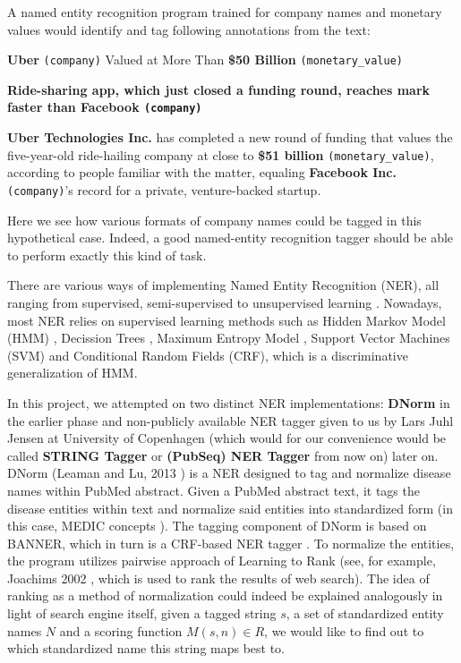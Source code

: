 A named entity recognition program trained for company names and monetary values would identify and tag following annotations from the text:

\begin{displayquote}
{\Large \textbf{Uber} \texttt{(company)} Valued at More Than  \textbf{\$50 Billion } \texttt{(monetary\_value)}}


\textbf{Ride-sharing app, which just closed a funding round, reaches mark faster than \textbf{Facebook} \texttt{(company)}}

\textbf{Uber Technologies Inc.} has completed a new round of funding that values the five-year-old ride-hailing company at close to \textbf{\$51 billion} \texttt{(monetary\_value)}, according to people familiar with the matter, equaling \textbf{Facebook Inc.} \texttt{(company)}’s record for a private, venture-backed startup.

\end{displayquote}

Here we see how various formats of company names could be tagged in this hypothetical case. Indeed, a good named-entity recognition tagger should be able to perform exactly this kind of task.

There are various ways of implementing Named Entity Recognition (NER), all ranging from supervised, semi-supervised to unsupervised learning \citep{nadeau2007survey}. Nowadays, most NER relies on supervised learning methods \citep{nadeau2007survey} such as Hidden Markov Model (HMM) \citep{bikel1997nymble}, Decission Trees \citep{sekine1998decision}, Maximum Entropy Model \citep{borthwick1998exploiting}, Support
Vector Machines (SVM) \citep{asahara2003japanese} and Conditional Random Fields (CRF)\citep{mccallum2003early}, which is a discriminative generalization of HMM\citep{lafferty2001conditional}.

In this project, we attempted on two distinct NER implementations: \textbf{DNorm} in the earlier phase and non-publicly available NER tagger given to us by Lars Juhl Jensen at University of Copenhagen (which would for our convenience would be called \textbf{STRING Tagger} or \textbf{(PubSeq) NER Tagger} from now on) later on. DNorm (Leaman and Lu, 2013 \citep{leaman2013dnorm}) is a NER designed to tag and normalize disease names within PubMed abstract. Given a PubMed abstract text, it tags the disease entities within text and normalize said entities into standardized form (in this case, MEDIC concepts \citep{davis2012medic}). The tagging component of DNorm is based on BANNER, which in turn is a CRF-based NER tagger \citep{leaman2008banner}. To normalize the entities, the program utilizes pairwise approach of Learning to Rank \citep{liu2009learning} (see, for example, Joachims 2002 \citep{joachims2002optimizing}, which is used to rank the results of web search). The idea of ranking as a method of normalization could indeed be explained analogously in light of search engine itself, given a tagged string $s$, a set of standardized entity names $N$ and a scoring function $M(s, n) \in R$, we would like to find out to which standardized name this string maps best to.

